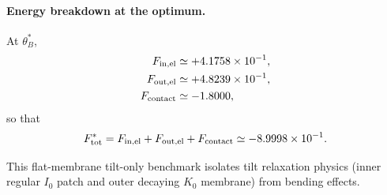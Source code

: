 \documentclass[11pt]{article}
\begin{document}
\paragraph{Energy breakdown at the optimum.}
At $\theta_B^\ast$,
\begin{align}
F_{\rm in,el} &\simeq +4.1758\times 10^{-1},\\
F_{\rm out,el} &\simeq +4.8239\times 10^{-1},\\
F_{\rm contact} &\simeq -1.8000,
\end{align}
so that
\begin{equation}
F_{\rm tot}^\ast
=
F_{\rm in,el}+F_{\rm out,el}+F_{\rm contact}
\simeq -8.9998\times 10^{-1}.
\end{equation}

\noindent
This flat-membrane tilt-only benchmark isolates tilt relaxation physics
(inner regular $I_0$ patch and outer decaying $K_0$ membrane) from bending effects.
\end{document}
